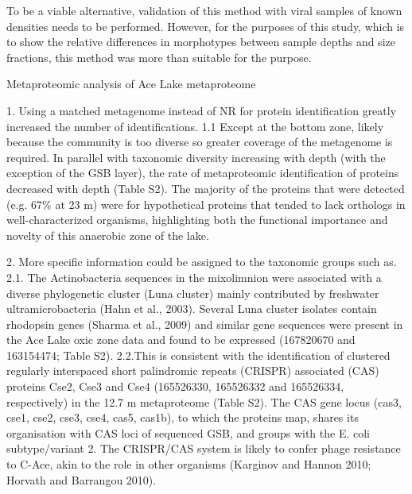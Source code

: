To be a viable alternative, validation of this method with viral samples of known densities needs to be performed. 
However, for the purposes of this study, which is to show the relative differences in morphotypes between sample depths and size fractions, this method was more than suitable for the purpose.

Metaproteomic analysis of Ace Lake metaproteome 

1. Using a matched metagenome instead of NR for protein identification greatly increased the number of identifications.
1.1 Except at the bottom zone, likely because the community is too diverse so greater coverage of the metagenome is required. %
In parallel with taxonomic diversity increasing with depth (with the exception of the GSB layer), the rate of metaproteomic identification of proteins decreased with depth (Table S2). 
The majority of the proteins that were detected (e.g. 67\% at 23 m) were for hypothetical proteins that tended to lack orthologs in well-characterized organisms, highlighting both the functional importance and novelty of this anaerobic zone of the lake.

2. More specific information could be assigned to the taxonomic groups such as.
2.1. The Actinobacteria sequences in the mixolimnion were associated with a diverse phylogenetic cluster (Luna cluster) mainly contributed by freshwater ultramicrobacteria (Hahn et al., 2003). 
Several Luna cluster isolates contain rhodopsin genes (Sharma et al., 2009) and similar gene sequences were present in the Ace Lake oxic zone data and found to be expressed (167820670 and 163154474; Table S2).
2.2.This is consistent with the identification of clustered regularly interspaced short palindromic repeats (CRISPR) associated (CAS) proteins Cse2, Cse3 and Cse4 (165526330, 165526332 and 165526334, respectively) in the 12.7 m metaproteome (Table S2). 
The CAS gene locus (cas3, cse1, cse2, cse3, cse4, cas5, cas1b), to which the proteins map, shares its organisation with CAS loci of sequenced GSB, and groups with the E. coli subtype/variant 2. The CRISPR/CAS system is likely to confer phage resistance to C-Ace, akin to the role in other organisms (Karginov and Hannon 2010; Horvath and Barrangou 2010).

